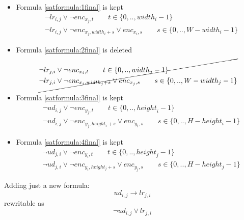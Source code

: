 \begin{itemize}
    \item Formula \ref{satformula:1final} is kept
        \begin{equation*}
        \begin{aligned}
        &\neg lr_{i,j} \vee \neg {enc}_{x_{j},t} \qquad t \in \{ 0,.., {width}_i -1\}
        \\
        &\neg lr_{i,j} \vee \neg {enc}_{x_{j},{width}_i+s} \vee {enc}_{x_{i},s} \qquad s \in \{ 0,.., W-{width}_i-1\}
        \end{aligned}
        \end{equation*}
    \item Formula \ref{satformula:2final} is deleted
        \begin{equation*}
        \cancel{
        \begin{aligned}
            &\neg lr_{j,i} \vee \neg {enc}_{x_{i},t} \qquad t \in \{ 0,.., {width}_j -1\}
            \\
            &\neg lr_{j,i} \vee \neg {enc}_{x_{i},{width}_j+s} \vee {enc}_{x_{j},s} \qquad s \in \{ 0,.., W-{width}_j-1\}
        \end{aligned}
        }
        \end{equation*}
    \item Formula \ref{satformula:3final} is kept
        \begin{equation*}
        \begin{aligned}
        &\neg ud_{i,j} \vee \neg{enc}_{y_{j},t} \qquad t \in \{ 0,.., {height}_i -1\}
        \\
        &\neg ud_{i,j} \vee \neg {enc}_{y_{j},height_{i}+s} \vee enc_{y_{i},s} \qquad s \in \{ 0,.., H-height_i-1\}
        \end{aligned}
        \end{equation*}
    \item Formula \ref{satformula:4final} is kept
        \begin{equation*}
        \begin{aligned}
        &\neg ud_{j,i} \vee \neg{enc}_{y_{i},t} \qquad t \in \{ 0,.., {height}_j -1\}
        \\
        &\neg ud_{j,i} \vee \neg {enc}_{y_{i},height_{j}+s} \vee enc_{y_{j},s} \qquad s \in \{ 0,.., H-height_j-1\}
        \end{aligned}
        \end{equation*}
\end{itemize}
Adding just a new formula:
$$ud_{i,j} \rightarrow {lr}_{j,i}$$ rewritable as $$\neg ud_{i,j} \vee {lr}_{j,i}$$


